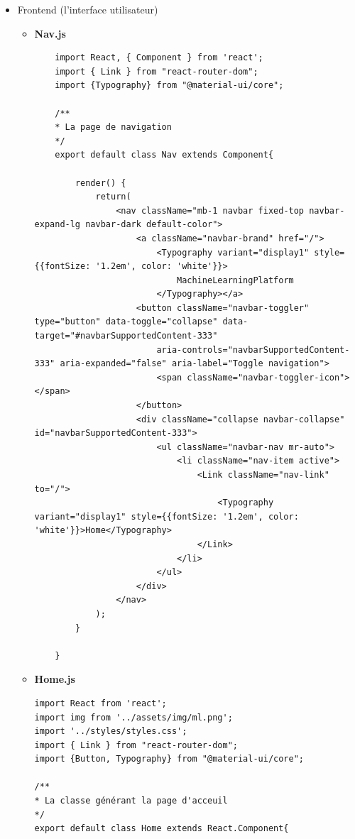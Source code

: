 \documentclass[a4paper,11pt]{article}
\begin{document}
    \begin{itemize}
        \item Frontend (l'interface utilisateur)
            \begin{itemize}

                \item \textbf{Nav.js}
\begin{verbatim}
    import React, { Component } from 'react';
    import { Link } from "react-router-dom";
    import {Typography} from "@material-ui/core";

    /**
    * La page de navigation
    */
    export default class Nav extends Component{

        render() {
            return(
                <nav className="mb-1 navbar fixed-top navbar-expand-lg navbar-dark default-color">
                    <a className="navbar-brand" href="/">
                        <Typography variant="display1" style={{fontSize: '1.2em', color: 'white'}}>
                            MachineLearningPlatform
                        </Typography></a>
                    <button className="navbar-toggler" type="button" data-toggle="collapse" data-target="#navbarSupportedContent-333"
                        aria-controls="navbarSupportedContent-333" aria-expanded="false" aria-label="Toggle navigation">
                        <span className="navbar-toggler-icon"></span>
                    </button>
                    <div className="collapse navbar-collapse" id="navbarSupportedContent-333">
                        <ul className="navbar-nav mr-auto">
                            <li className="nav-item active">
                                <Link className="nav-link" to="/">
                                    <Typography variant="display1" style={{fontSize: '1.2em', color: 'white'}}>Home</Typography>
                                </Link>
                            </li>
                        </ul>
                    </div>
                </nav>
            );
        }

    }

\end{verbatim}
\item \textbf{Home.js}
\begin{verbatim}
import React from 'react';
import img from '../assets/img/ml.png';
import '../styles/styles.css';
import { Link } from "react-router-dom";
import {Button, Typography} from "@material-ui/core";

/**
* La classe générant la page d'acceuil
*/
export default class Home extends React.Component{


\end{verbatim}
\end{itemize}
\end{itemize}
\end{document}
